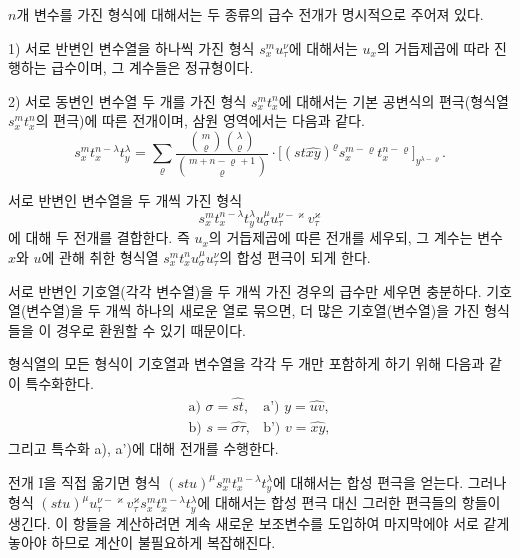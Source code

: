 $n$개 변수를 가진 형식에 대해서는 두 종류의 급수 전개가 명시적으로 주어져 있다.

1) 서로 반변인 변수열을 하나씩 가진 형식 $s_x^m u_\tau^\nu$에 대해서는 $u_x$의 거듭제곱에 따라 진행하는 급수이며, 그 계수들은 \glqq{}정규형\grqq{}이다.

2) 서로 동변인 변수열 두 개를 가진 형식 $s_x^m t_x^n$에 대해서는 기본 공변식의 편극(형식열 $s_x^m t_x^n$의 편극)에 따른 전개이며, 삼원 영역에서는 다음과 같다.
\[
\tag{I}
s_x^m t_x^{n-\lambda}t_y^\lambda
=\sum_{\varrho}
\frac{\binom{m}{\varrho}\binom{\lambda}{\varrho}}
 {\binom{m+n-\varrho+1}{\varrho}}\cdot
\bigl[(st\widehat{xy})^\varrho s_x^{m-\varrho}t_x^{n-\varrho}\bigr]_{y^{\lambda-\varrho}}.
\]

서로 반변인 변수열을 두 개씩 가진 형식
\[
s_x^m t_x^{n-\lambda}t_y^\lambda u_\sigma^\mu u_\tau^{\nu-\varkappa}v_\tau^\varkappa
\]
에 대해 두 전개를 결합한다. 즉 $u_x$의 거듭제곱에 따른 전개를 세우되, 그 계수는 변수 $x$와 $u$에 관해 취한 형식열 $s_x^m t_x^n u_\sigma^\mu u_\tau^\nu$의 합성 편극이 되게 한다.

서로 반변인 기호열(각각 변수열)을 두 개씩 가진 경우의 급수만 세우면 충분하다. 기호열(변수열)을 두 개씩 하나의 새로운 열로 묶으면, 더 많은 기호열(변수열)을 가진 형식들을 이 경우로 환원할 수 있기 때문이다.

형식열의 모든 형식이 기호열과 변수열을 각각 두 개만 포함하게 하기 위해 다음과 같이 특수화한다.
\[
\begin{array}{ll}
\text{a) } \sigma=\widehat{st}, & \text{a') } y=\widehat{uv},\\[0.3em]
\text{b) } s=\widehat{\sigma\tau}, & \text{b') } v=\widehat{xy},
\end{array}
\]
그리고 특수화 a), a')에 대해 전개를 수행한다.

전개 I을 직접 옮기면 형식 $(stu)^\mu s_x^m t_x^{n-\lambda}t_y^\lambda$에 대해서는 합성 편극을 얻는다. 그러나 형식 $(stu)^\mu u_\tau^{\nu-\varkappa}v_\tau^\varkappa s_x^m t_x^{n-\lambda}t_y^\lambda$에 대해서는 합성 편극 대신 그러한 편극들의 항들이 생긴다. 이 항들을 계산하려면 계속 새로운 보조변수를 도입하여 마지막에야 서로 같게 놓아야 하므로 계산이 불필요하게 복잡해진다.


